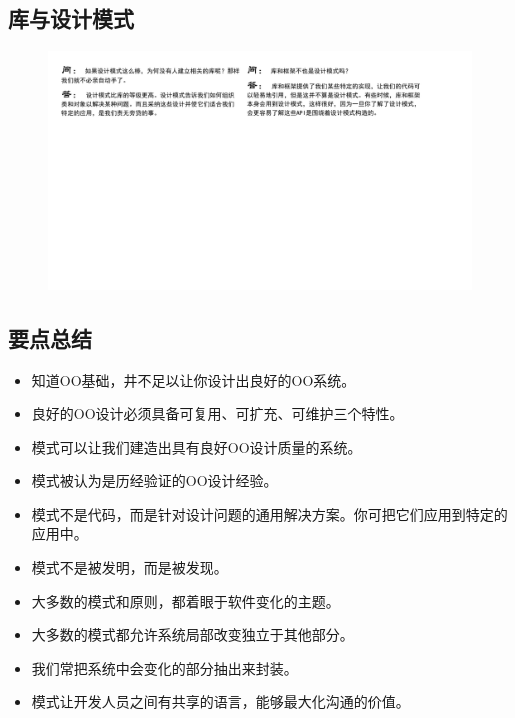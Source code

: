 \subsection{库与设计模式}
\begin{figure}[H]
    \vspace{-0.5em}
	\centering
	\includegraphics[width=\textwidth]{images/库与设计模式.pdf}
    \vspace{-1em}
\end{figure}

\subsection{要点总结}
\begin{itemize}
    \item 知道OO基础，井不足以让你设计出良好的OO系统。
    \item 良好的OO设计必须具备可复用、可扩充、可维护三个特性。
    \item 模式可以让我们建造出具有良好OO设计质量的系统。
    \item 模式被认为是历经验证的OO设计经验。
    \item 模式不是代码，而是针对设计问题的通用解决方案。你可把它们应用到特定的应用中。
    \item 模式不是被发明，而是被发现。
    \item 大多数的模式和原则，都着眼于软件变化的主题。
    \item 大多数的模式都允许系统局部改变独立于其他部分。
    \item 我们常把系统中会变化的部分抽出来封装。
    \item 模式让开发人员之间有共享的语言，能够最大化沟通的价值。
\end{itemize}




